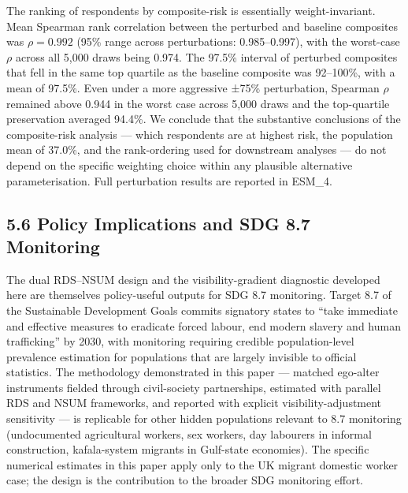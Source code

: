 \documentclass[
  12pt,
  letterpaper,
  DIV=11,
  numbers=noendperiod]{scrartcl}
\begin{document}
The ranking of respondents by composite-risk is essentially
weight-invariant. Mean Spearman rank correlation between the perturbed
and baseline composites was \(\rho = 0.992\) (95\% range across
perturbations: 0.985--0.997), with the worst-case \(\rho\) across all
5,000 draws being 0.974. The 97.5\% interval of perturbed composites
that fell in the same top quartile as the baseline composite was
92--100\%, with a mean of 97.5\%. Even under a more aggressive ±75\%
perturbation, Spearman \(\rho\) remained above 0.944 in the worst case
across 5,000 draws and the top-quartile preservation averaged 94.4\%. We
conclude that the substantive conclusions of the composite-risk analysis
--- which respondents are at highest risk, the population mean of
37.0\%, and the rank-ordering used for downstream analyses --- do not
depend on the specific weighting choice within any plausible alternative
parameterisation. Full perturbation results are reported in ESM\_4.

\subsection{5.6 Policy Implications and SDG 8.7
Monitoring}\label{policy-implications-and-sdg-8.7-monitoring}

The dual RDS--NSUM design and the visibility-gradient diagnostic
developed here are themselves policy-useful outputs for SDG 8.7
monitoring. Target 8.7 of the Sustainable Development Goals commits
signatory states to ``take immediate and effective measures to eradicate
forced labour, end modern slavery and human trafficking'' by 2030, with
monitoring requiring credible population-level prevalence estimation for
populations that are largely invisible to official statistics. The
methodology demonstrated in this paper --- matched ego-alter instruments
fielded through civil-society partnerships, estimated with parallel RDS
and NSUM frameworks, and reported with explicit visibility-adjustment
sensitivity --- is replicable for other hidden populations relevant to
8.7 monitoring (undocumented agricultural workers, sex workers, day
labourers in informal construction, kafala-system migrants in Gulf-state
economies). The specific numerical estimates in this paper apply only to
the UK migrant domestic worker case; the design is the contribution to
the broader SDG monitoring effort.
\end{document}
